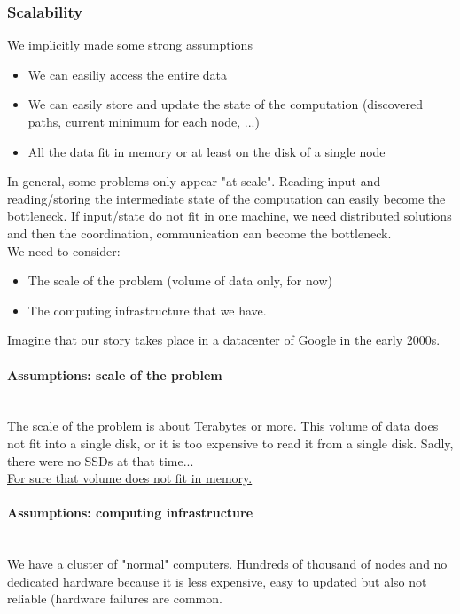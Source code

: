 \documentclass[10pt,a4paper]{article}
\newcommand{\myparagraph}[1]{\paragraph{#1}\mbox{}\\[0.05in]}
\begin{document}
\subsubsection{Scalability}
We implicitly made some strong assumptions
\begin{itemize}
	\item We can easiliy access the entire data
	\item We can easily store and update the state of the computation (discovered paths, current minimum for each node, ...)
	\item All the data fit in memory or at least on the disk of a single node
\end{itemize}
In general, some problems only appear "at scale". Reading input and reading/storing the intermediate state of the computation can easily become the bottleneck. If input/state do not fit in one machine, we need distributed solutions and then the coordination, communication can become the bottleneck. \pagebreak \\
We need to consider:
\begin{itemize}
	\item The scale of the problem (volume of data only, for now)
	\item The computing infrastructure that we have.
\end{itemize}
Imagine that our story takes place in a datacenter of Google in the early 2000s.
\myparagraph{Assumptions: scale of the problem}
The scale of the problem is about Terabytes or more. This volume of data does not fit into a single disk, or it is too expensive to read it from a single disk. Sadly, there were no SSDs at that time... \\ \underline{For sure that volume does not fit in memory.}
\myparagraph{Assumptions: computing infrastructure}
We have a cluster of "normal" computers. Hundreds of thousand of nodes and no dedicated hardware because it is less expensive, easy to updated but also not reliable (hardware failures are common.
\end{document}
